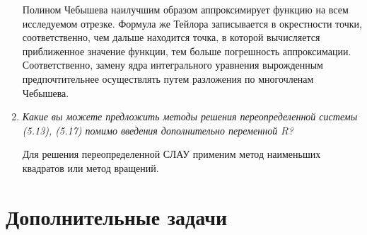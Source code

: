 \documentclass[12pt, a4paper]{article}
\begin{document}
\begin{enumerate}
		Полином Чебышева наилучшим образом аппроксимирует функцию на всем исследуемом отрезке. Формула же Тейлора записывается в окрестности точки, соответственно, чем дальше находится точка, в которой вычисляется приближенное значение функции, тем больше погрешность аппроксимации. Соответственно, замену ядра интегрального уравнения вырожденным предпочтительнее осуществлять путем разложения по многочленам Чебышева.
		\item \textit{Какие вы можете предложить методы решения переопределенной системы (5.13), (5.17) помимо введения дополнительно переменной $R$?}
		\smallskip
		
		Для решения переопределенной СЛАУ применим метод наименьших квадратов или метод вращений.
		
	\end{enumerate}
	
	\newpage
	\section{Дополнительные задачи}
	
\end{document}
